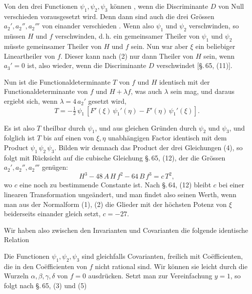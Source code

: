 
Von den drei Functionen $\psi_1, \psi_2, \psi_3$ können , wenn die Discriminante
$D$ von Null verschieden vorausgesetzt wird. Denn
dann sind auch die drei Grössen $a_2', a_2'', a_2'''$ von einander verschieden
. Wenn also $\psi_1$ und $\psi_2$ verschwinden, so müssen $H$ und
$f$ verschwinden, d.\,h. ein gemeinsamer Theiler von $\psi_1$ und $\psi_2$
müsste gemeinsamer Theiler von $H$ und $f$ sein. Nun war aber $\xi$
ein beliebiger Lineartheiler von $f$. Dieser kann nach (2) nur
dann Theiler von $H$ sein, wenn $a_3' = 0$ ist, also wieder, wenn
die Discriminante $D$ verschwindet [§.\,65, (11)].

Nun ist die Functionaldeterminante $T$ von $f$ und $H$ identisch
mit der Functionaldeterminante von $f$ und $H + \lambda f$, was auch
$\lambda$ sein mag, und daraus ergiebt sich, wenn $\lambda = 4\,a_2'$ gesetzt
wird,
\[
T = -\tfrac{1}{2}\,\psi_1\,[F'(\xi)\,\psi_1'(\eta) - F'(\eta)\,\psi_1'(\xi)].
\]

Es ist also $T$ theilbar durch $\psi_1$, und aus gleichen Gründen
durch $\psi_2$ und $\psi_3$, und folglich ist $T$ bis auf einen von $\xi, \eta$ unabhängigen
 Factor identisch mit dem Product $\psi_1\,\psi_2\,\psi_3$.
Bilden wir demnach das Product der drei Gleichungen (4),
so folgt mit Rücksicht auf die cubische Gleichung §.\,65, (12),
der die Grössen $a_2', a_2'', a_2'''$ genügen:
\[
H^3 - 48\,A\,H\,f^2 - 64\,B\,f^3 = c\,T^2,
\]
wo $c$ eine noch zu bestimmende Constante ist. Nach §.\,64, (12)
bleibt $c$ bei einer linearen Transformation ungeändert, und man
findet also seinen Werth, wenn man aus der Normalform (1), (2)
die Glieder mit der höchsten Potenz von $\xi$ beiderseits einander
gleich setzt, $c = -27$.

Wir haben also zwischen den Invarianten und Covarianten
die folgende identische Relation

Die Functionen $\psi_1, \psi_2, \psi_3$ sind gleichfalls Covarianten, freilich
 mit Coëfficienten, die in den Coëfficienten von $f$ nicht rational
 sind. Wir können sie leicht durch die Wurzeln $\alpha, \beta, \gamma, \delta$
von $f = 0$ ausdrücken. Setzt man zur Vereinfachung $y = 1$,
so folgt nach §.\,65, (3) und (5)

